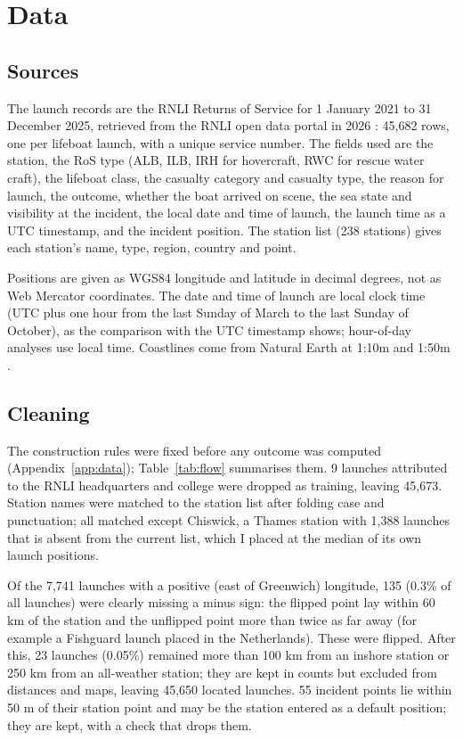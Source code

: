 \documentclass[11pt,a4paper]{article}
\begin{document}
\section{Data}\label{sec:data}
\subsection{Sources}
The launch records are the RNLI Returns of Service for 1 January 2021 to 31 December 2025, retrieved from the RNLI open data portal in 2026 \citep{rnlidata}: 45,682 rows, one per lifeboat launch, with a unique service number. The fields used are the station, the RoS type (ALB, ILB, IRH for hovercraft, RWC for rescue water craft), the lifeboat class, the casualty category and casualty type, the reason for launch, the outcome, whether the boat arrived on scene, the sea state and visibility at the incident, the local date and time of launch, the launch time as a UTC timestamp, and the incident position. The station list (238 stations) gives each station's name, type, region, country and point.

Positions are given as WGS84 longitude and latitude in decimal degrees, not as Web Mercator coordinates. The date and time of launch are local clock time (UTC plus one hour from the last Sunday of March to the last Sunday of October), as the comparison with the UTC timestamp shows; hour-of-day analyses use local time. Coastlines come from Natural Earth at 1:10m and 1:50m \citep{naturalearth}.

\subsection{Cleaning}
The construction rules were fixed before any outcome was computed (Appendix~\ref{app:data}); Table~\ref{tab:flow} summarises them. 9 launches attributed to the RNLI headquarters and college were dropped as training, leaving 45,673. Station names were matched to the station list after folding case and punctuation; all matched except Chiswick, a Thames station with 1,388 launches that is absent from the current list, which I placed at the median of its own launch positions.

Of the 7,741 launches with a positive (east of Greenwich) longitude, 135 (0.3\% of all launches) were clearly missing a minus sign: the flipped point lay within 60 km of the station and the unflipped point more than twice as far away (for example a Fishguard launch placed in the Netherlands). These were flipped. After this, 23 launches (0.05\%) remained more than 100 km from an inshore station or 250 km from an all-weather station; they are kept in counts but excluded from distances and maps, leaving 45,650 located launches. 55 incident points lie within 50 m of their station point and may be the station entered as a default position; they are kept, with a check that drops them.
\end{document}
